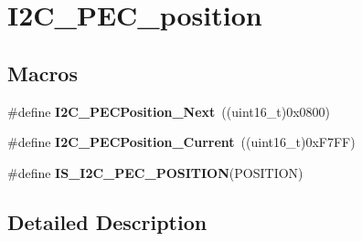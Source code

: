 \hypertarget{group___i2_c___p_e_c__position}{\section{I2\-C\-\_\-\-P\-E\-C\-\_\-position}
\label{group___i2_c___p_e_c__position}
}
\subsection*{Macros}
\begin{DoxyCompactItemize}
\item 
\hypertarget{group___i2_c___p_e_c__position_ga74d0996efe6e278fb28d053ba78fccc5}{\#define {\bfseries I2\-C\-\_\-\-P\-E\-C\-Position\-\_\-\-Next}~((uint16\-\_\-t)0x0800)}\label{group___i2_c___p_e_c__position_ga74d0996efe6e278fb28d053ba78fccc5}

\item 
\hypertarget{group___i2_c___p_e_c__position_ga8a393364dd651f88bcaebac71c1c52c7}{\#define {\bfseries I2\-C\-\_\-\-P\-E\-C\-Position\-\_\-\-Current}~((uint16\-\_\-t)0x\-F7\-F\-F)}\label{group___i2_c___p_e_c__position_ga8a393364dd651f88bcaebac71c1c52c7}

\item 
\#define {\bfseries I\-S\-\_\-\-I2\-C\-\_\-\-P\-E\-C\-\_\-\-P\-O\-S\-I\-T\-I\-O\-N}(P\-O\-S\-I\-T\-I\-O\-N)
\end{DoxyCompactItemize}


\subsection{Detailed Description}


